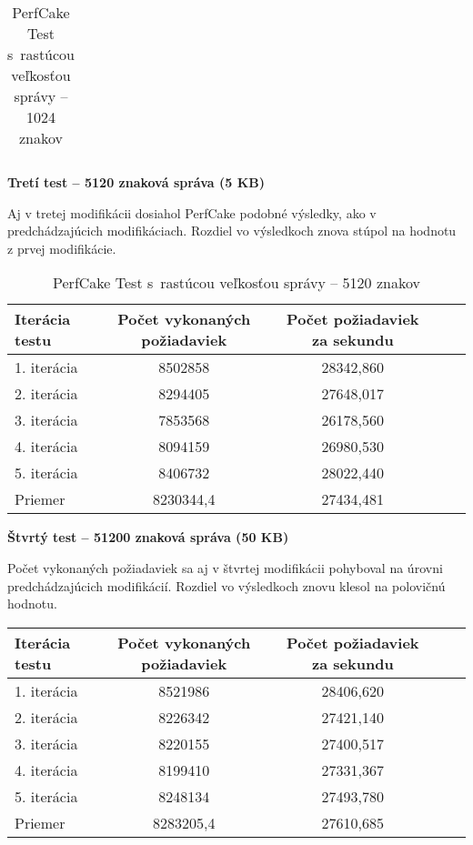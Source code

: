 \documentclass[12pt,oneside,final]{fithesis-utf8}
\begin{document}
\begin{itemize}
\begin{table}[H]
\begin{center}
\begin{tabular}{ | l | c | c | c | c |}
\end{tabular}
\end{center}
\caption{PerfCake Test s~rastúcou veľkosťou správy -- 1024 znakov}
\end{table}


\textbf{Tretí test -- 5120 znaková správa (5 KB)}

Aj v tretej modifikácii dosiahol PerfCake podobné výsledky, ako v predchádzajúcich modifikáciach. Rozdiel vo výsledkoch znova stúpol na hodnotu z prvej modifikácie.

\begin{table}[H]
\begin{center}
\begin{tabular}{ | l | c | c | c | c |}
		\hline
		 \textbf{Iterácia testu} & \textbf{Počet vykonaných požiadaviek} & \textbf{Počet požiadaviek za sekundu} \\ \hline
		 1. iterácia & 8502858 & 28342,860 \\ \hline
		 2. iterácia & 8294405 & 27648,017 \\ \hline
		 3. iterácia & 7853568 & 26178,560 \\ \hline
		 4. iterácia & 8094159 & 26980,530 \\ \hline
		 5. iterácia & 8406732 & 28022,440 \\ \hline
		 Priemer & 8230344,4 & 27434,481 \\ \hline
		 
\end{tabular}
\end{center}
\caption{PerfCake Test s~rastúcou veľkosťou správy -- 5120 znakov}
\end{table}


\textbf{Štvrtý test -- 51200 znaková správa (50 KB)}

Počet vykonaných požiadaviek sa aj v štvrtej modifikácii pohyboval na úrovni predchádzajúcich modifikácií. Rozdiel vo výsledkoch znovu klesol na polovičnú hodnotu.

\begin{table}[H]
\begin{center}
\begin{tabular}{ | l | c | c | c | c |}
		\hline
		 \textbf{Iterácia testu} & \textbf{Počet vykonaných požiadaviek} & \textbf{Počet požiadaviek za sekundu} \\ \hline
		 1. iterácia & 8521986 & 28406,620 \\ \hline
		 2. iterácia & 8226342 & 27421,140 \\ \hline
		 3. iterácia & 8220155 & 27400,517 \\ \hline
		 4. iterácia & 8199410 & 27331,367 \\ \hline
		 5. iterácia & 8248134 & 27493,780 \\ \hline
		 Priemer & 8283205,4 & 27610,685 \\ \hline
		 

\end{tabular}
\end{center}
\end{table}
\end{itemize}
\end{document}
